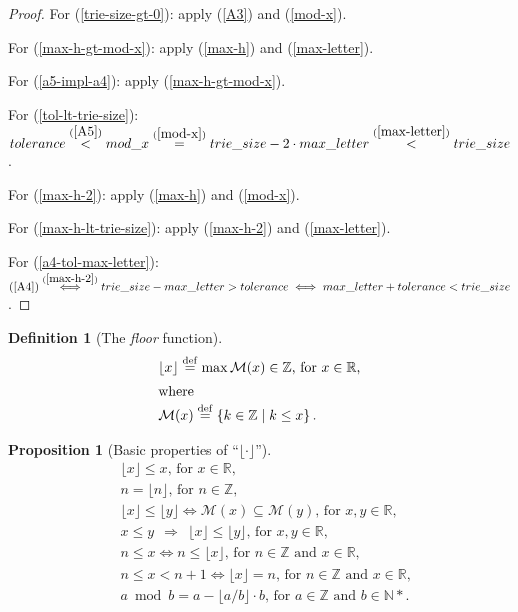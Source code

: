 \documentclass[a4paper,9pt,leqno]{article}
\renewcommand{\=}{\protect\nobreakdash-\hspace{0pt}}
\renewcommand{\~}{\protect\nobreakdash--\hspace{0pt}}
\theoremstyle{plain}
\newtheorem{prop}[fact]{Proposition}
\theoremstyle{definition}
\newtheorem{defn}[fact]{Definition}
\theoremstyle{remark}
\newcommand{\floor}[1]{\lfloor#1\rfloor}
\newcommand{\impll}{\:\:\Longrightarrow\:\:}
\newcommand{\impl}{\impll}%
\newcommand{\iffl}{\:\:\Longleftrightarrow\:\:}
\newcommand{\parref}[1]{(\ref{#1})}
\newcommand{\by}[1]{{#1}}
\newcommand{\bydef}{\by{def}}
\newcommand{\symby}[2]{\stackrel{#1}{{#2}}}
\newcommand{\symbyrm}[2]{\symby{{\rm\scriptstyle{#1}}}{#2}}
\newcommand{\iffby}[1]{\symbyrm{#1}{\iffl}}
\newcommand{\iffbyref}[1]{\iffby{\parref{#1}}}
\newcommand{\eqby}[1]{\symbyrm{#1}{=}}
\newcommand{\eqbydef}{\eqby{\bydef}}
\newcommand{\eqbyref}[1]{\eqby{\parref{#1}}}
\newcommand{\gt}{>}
\newcommand{\lt}{<}
\newcommand{\ltby}[1]{\symbyrm{#1}{\lt}}
\newcommand{\ltbyref}[1]{\ltby{\parref{#1}}}
\newcommand{\lc}{\left\{}
\newcommand{\rc}{\right\}}
\newcommand\Nat{\mathbb{N}}
\newcommand\Nat*{\mathbb{N}^*}
\newcommand\Int{\mathbb{Z}}
\newcommand\Int*{\mathbb{Z}^*}
\newcommand\Real{\mathbb{R}}
\newcommand\Real*{\mathbb{R}^*}
\begin{document}
\begin{proof}
For \parref{trie-size-gt-0}: apply \parref{A3} and \parref{mod-x}.

For \parref{max-h-gt-mod-x}: apply \parref{max-h} and \parref{max-letter}.

For \parref{a5-impl-a4}: apply \parref{max-h-gt-mod-x}.

For \parref{tol-lt-trie-size}: $tolerance \ltbyref{A5} mod\_x \eqbyref{mod-x}
trie\_size - 2 \cdot max\_letter \ltbyref{max-letter} trie\_size$.

For \parref{max-h-2}: apply \parref{max-h} and \parref{mod-x}.

For \parref{max-h-lt-trie-size}: apply \parref{max-h-2} and \parref{max-letter}.

For \parref{a4-tol-max-letter}: $\text{\parref{A4}}
\iffbyref{max-h-2} trie\_size - max\_letter \gt tolerance
\iff max\_letter + tolerance \lt trie\_size$.
\end{proof}

\begin{defn}[The \emph{floor} function]
\begin{align}
& \floor{x} \eqbydef \max \mathcal{M}(x) \in \Int\text{, for $x \in \Real$,}
                                                           \label{floor-def}\\
\intertext{where}
& \mathcal{M}(x) \eqbydef \lc k \in \Int \mid k \le x \rc. \label{floor-em}
\end{align}
\end{defn}

\begin{prop}[Basic properties of ``$\floor{\cdot}$'']
\begin{align}
& \floor{x} \le x\text{, for $x \in \Real$,} \label{floor-le}\\
%
& n = \floor{n}\text{, for $n \in \Int$,}    \label{floor-eq}\\
%
& \floor{x} \le \floor{y} \iff \mathcal{M}(x) \subseteq \mathcal{M}(y)\text{, for $x, y \in \Real$,}
                                             \label{floor-em-inc}\\
%
& x \le y \impl \floor{x} \le \floor{y}\text{, for $x, y \in \Real$,}
                                             \label{floor-inc}\\
%
& n \le x \iff n \le \floor{x}\text{, for $n \in \Int$ and $x \in \Real$,}
                                             \label{floor-int}\\
%
& n \le x \lt n + 1 \iff \floor{x} = n\text{, for $n \in \Int$ and $x \in \Real$,}
                                             \label{floor-int-2}\\
%
& a \bmod b = a - \floor{a / b} \cdot b\text{, for $a \in \Int$ and $b \in \Nat*$.}
                                             \label{floor-mod}
\end{align}
\end{prop}
\end{document}
